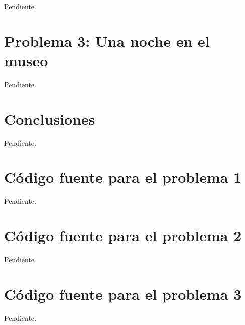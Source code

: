 \documentclass[a4paper,10pt,twoside]{article}
\begin{document}
Pendiente.




\section{Problema 3: Una noche en el museo}

Pendiente.




\section{Conclusiones}

Pendiente.



\newpage

\begin{appendices}

\section{Código fuente para el problema 1}

Pendiente.




\section{Código fuente para el problema 2}

Pendiente.




\section{Código fuente para el problema 3}

Pendiente.


\end{appendices}
\end{document}
